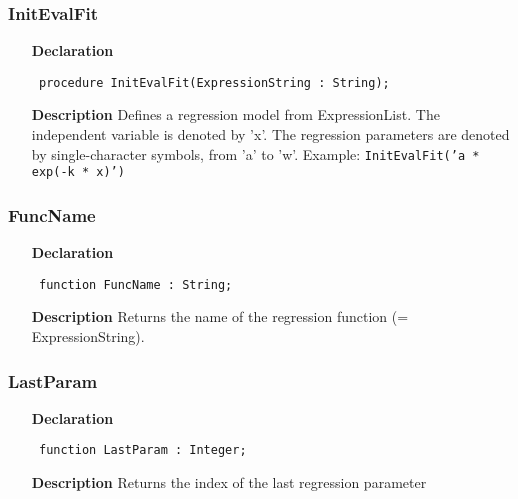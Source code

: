 \documentclass[12pt,a4paper,oneside]{report}
\newcommand{\declarationitem}[1]{\textbf{#1}}
\newcommand{\descriptiontitle}[1]{\textbf{#1}}
\newcommand{\code}[1]{\texttt{#1}}
\begin{document}
\subsubsection{InitEvalFit}
\label{uevalfit-InitEvalFit}
\begin{itemize}\item[\declarationitem{Declaration}\hfill]
	\begin{flushleft}
		\code{
			procedure InitEvalFit(ExpressionString : String);}
		
	\end{flushleft}
	
	\par
	\item[\descriptiontitle{Description}]
	Defines a regression model from ExpressionList. The independent variable is denoted by 'x'. The regression parameters are denoted by single{-}character symbols, from 'a' to 'w'. Example: \code{InitEvalFit('a * exp({-}k * x)')}
	
\end{itemize}
\subsubsection{FuncName}
\label{uevalfit-FuncName}
\begin{itemize}\item[\declarationitem{Declaration}\hfill]
	\begin{flushleft}
		\code{
			function FuncName : String;}
		
	\end{flushleft}
	
	\par
	\item[\descriptiontitle{Description}]
	Returns the name of the regression function (= ExpressionString).
	
\end{itemize}
\subsubsection{LastParam}
\label{uevalfit-LastParam}
\begin{itemize}\item[\declarationitem{Declaration}\hfill]
	\begin{flushleft}
		\code{
			function LastParam : Integer;}
		
	\end{flushleft}
	
	\par
	\item[\descriptiontitle{Description}]
	Returns the index of the last regression parameter
	
\end{itemize}
\end{document}
